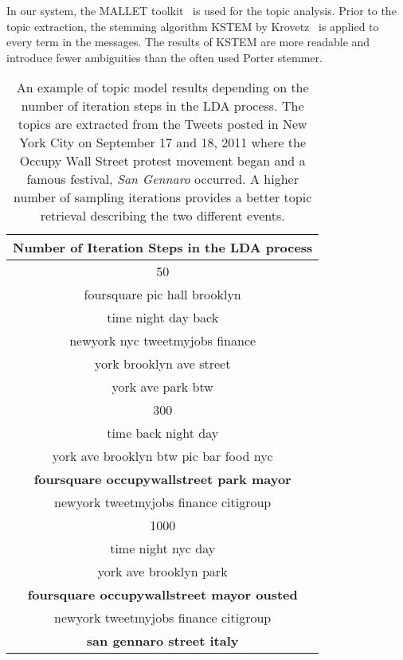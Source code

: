 In our system, the MALLET toolkit~\cite{McCallum:2002:MALLET} is used for the topic analysis.
Prior to the topic extraction, the stemming algorithm KSTEM by Krovetz~\cite{Krovetz} is applied to every term in the messages.
The results of KSTEM are more readable and introduce fewer ambiguities than the often used Porter stemmer.

\begin{table}[ht]%
\begin{center}
\begin{tabular}{|c|}
	\hline
	Number of Iteration Steps in the LDA process\\
	\hline
	50 \\
	\hline\hline
	foursquare pic hall brooklyn \\
	time night day back \\
	newyork nyc tweetmyjobs finance \\
	york brooklyn ave street \\
	york ave park btw \\
	\hline
	300 \\
	\hline\hline
	time back night day \\
	york ave brooklyn btw
	pic bar food nyc \\
	\textbf{foursquare occupywallstreet park mayor} \\
	newyork tweetmyjobs finance citigroup \\
	\hline
	1000 \\
	\hline\hline
	time night nyc day   \\
	york ave brooklyn park  \\
	\textbf{foursquare occupywallstreet  mayor ousted} \\
	newyork tweetmyjobs finance citigroup  \\
	\textbf{san gennaro street italy}   \\
	\hline
\end{tabular}
\end{center}
\caption{An example of topic model results depending on the number of iteration steps in the LDA process.
The topics are extracted from the Tweets posted in New York City on September 17 and 18, 2011 where the Occupy Wall Street protest movement began and
a famous festival, \textit{San Gennaro} occurred.
A higher number of sampling iterations provides a better topic retrieval describing the two different events.}
\label{T:TopicResults}
\end{table}

